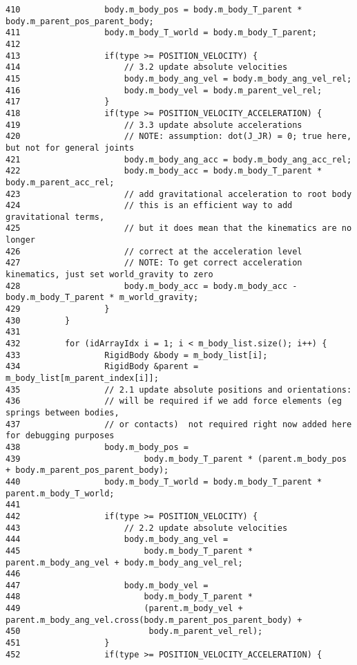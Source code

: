 \begin{Code}
\begin{verbatim}
410                 body.m_body_pos = body.m_body_T_parent * body.m_parent_pos_parent_body;
411                 body.m_body_T_world = body.m_body_T_parent;
412 
413                 if(type >= POSITION_VELOCITY) {
414                     // 3.2 update absolute velocities
415                     body.m_body_ang_vel = body.m_body_ang_vel_rel;
416                     body.m_body_vel = body.m_parent_vel_rel;
417                 }
418                 if(type >= POSITION_VELOCITY_ACCELERATION) {
419                     // 3.3 update absolute accelerations
420                     // NOTE: assumption: dot(J_JR) = 0; true here, but not for general joints
421                     body.m_body_ang_acc = body.m_body_ang_acc_rel;
422                     body.m_body_acc = body.m_body_T_parent * body.m_parent_acc_rel;
423                     // add gravitational acceleration to root body
424                     // this is an efficient way to add gravitational terms,
425                     // but it does mean that the kinematics are no longer
426                     // correct at the acceleration level
427                     // NOTE: To get correct acceleration kinematics, just set world_gravity to zero
428                     body.m_body_acc = body.m_body_acc - body.m_body_T_parent * m_world_gravity;
429                 }
430         }
431 
432         for (idArrayIdx i = 1; i < m_body_list.size(); i++) {
433                 RigidBody &body = m_body_list[i];
434                 RigidBody &parent = m_body_list[m_parent_index[i]];
435                 // 2.1 update absolute positions and orientations:
436                 // will be required if we add force elements (eg springs between bodies,
437                 // or contacts)  not required right now added here for debugging purposes
438                 body.m_body_pos =
439                         body.m_body_T_parent * (parent.m_body_pos + body.m_parent_pos_parent_body);
440                 body.m_body_T_world = body.m_body_T_parent * parent.m_body_T_world;
441 
442                 if(type >= POSITION_VELOCITY) {
443                     // 2.2 update absolute velocities
444                     body.m_body_ang_vel =
445                         body.m_body_T_parent * parent.m_body_ang_vel + body.m_body_ang_vel_rel;
446 
447                     body.m_body_vel =
448                         body.m_body_T_parent *
449                         (parent.m_body_vel + parent.m_body_ang_vel.cross(body.m_parent_pos_parent_body) +
450                          body.m_parent_vel_rel);
451                 }
452                 if(type >= POSITION_VELOCITY_ACCELERATION) {

\end{verbatim}
\end{Code}
